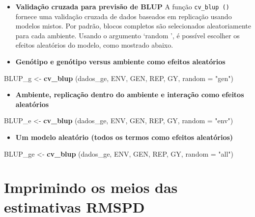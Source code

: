 \documentclass[
]{book}
\newenvironment{Shaded}{\begin{snugshade}}{\end{snugshade}}
\newcommand{\DataTypeTok}[1]{\textcolor[rgb]{0.13,0.29,0.53}{#1}}
\newcommand{\KeywordTok}[1]{\textcolor[rgb]{0.13,0.29,0.53}{\textbf{#1}}}
\newcommand{\NormalTok}[1]{#1}
\newcommand{\StringTok}[1]{\textcolor[rgb]{0.31,0.60,0.02}{#1}}
\providecommand{\tightlist}{%
  \setlength{\itemsep}{0pt}\setlength{\parskip}{0pt}}
\begin{document}
\begin{itemize}
\item
  \textbf{Validação cruzada para previsão de BLUP}
  A função \texttt{cv\_blup\ ()} fornece uma validação cruzada de dados baseados em replicação usando modelos mistos. Por padrão, blocos completos são selecionados aleatoriamente para cada ambiente. Usando o argumento `random ', é possível escolher os efeitos aleatórios do modelo, como mostrado abaixo.
\item
  \textbf{Genótipo e genótipo versus ambiente como efeitos aleatórios}
\end{itemize}

\begin{Shaded}
\begin{Highlighting}[]
\NormalTok{BLUP_g <-}\StringTok{ }\KeywordTok{cv_blup}\NormalTok{ (dados_ge, ENV, GEN, REP, GY, }\DataTypeTok{random =} \StringTok{"gen"}\NormalTok{)}
\end{Highlighting}
\end{Shaded}

\begin{itemize}
\tightlist
\item
  \textbf{Ambiente, replicação dentro do ambiente e interação como efeitos aleatórios}
\end{itemize}

\begin{Shaded}
\begin{Highlighting}[]
\NormalTok{BLUP_e <-}\StringTok{ }\KeywordTok{cv_blup}\NormalTok{ (dados_ge, ENV, GEN, REP, GY, }\DataTypeTok{random =} \StringTok{"env"}\NormalTok{)}
\end{Highlighting}
\end{Shaded}

\begin{itemize}
\tightlist
\item
  \textbf{Um modelo aleatório (todos os termos como efeitos aleatórios)}
\end{itemize}

\begin{Shaded}
\begin{Highlighting}[]
\NormalTok{BLUP_ge <-}\StringTok{ }\KeywordTok{cv_blup}\NormalTok{ (dados_ge, ENV, GEN, REP, GY, }\DataTypeTok{random =} \StringTok{"all"}\NormalTok{)}
\end{Highlighting}
\end{Shaded}

\hypertarget{imprimindo-os-meios-das-estimativas-rmspd}{%
\section{Imprimindo os meios das estimativas RMSPD}\label{imprimindo-os-meios-das-estimativas-rmspd}}
\end{document}

